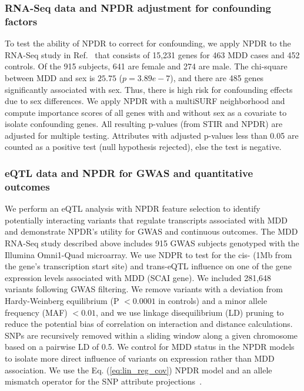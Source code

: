 \documentclass{bioinfo}
\begin{document}
\subsubsection{RNA-Seq data and NPDR adjustment for confounding factors}
To test the ability of NPDR to correct for confounding, we apply NPDR to the RNA-Seq study in Ref.~\citep{mostafavi14} that consists of 15,231 genes for 463 MDD cases and 452 controls.
Of the 915 subjects, 641 are female and 274 are male.
The chi-square between MDD and sex is $25.75$ ($p=3.89e-7$), and there are 485 genes significantly associated with sex.
Thus, there is high risk for confounding effects due to sex differences.
We apply NPDR with a multiSURF neighborhood and compute importance scores of all genes with and without sex as a covariate to isolate confounding genes. All resulting p-values (from STIR and NPDR) are adjusted for multiple testing.
Attributes with adjusted p-values less than 0.05 are counted as a positive test (null hypothesis rejected), else the test is negative.

\subsubsection{eQTL data and NPDR for GWAS and quantitative outcomes}
We perform an eQTL analysis with NPDR feature selection to identify potentially interacting variants that regulate transcripts associated with MDD and demonstrate NPDR's utility for GWAS and continuous outcomes.
The MDD RNA-Seq study described above includes 915 GWAS subjects genotyped with the Illumina Omni1-Quad microarray\citep{mostafavi14}.
We use NDPR to test for the cis- (1Mb from the gene's transcription start site) and trans-eQTL influence on one of the gene expression levels associated with MDD (SCAI gene).
We included 281,648 variants following GWAS filtering.
We remove variants with a deviation from Hardy-Weinberg equilibrium (P $<0.0001$ in controls) and a minor allele frequency (MAF) $<0.01$, and we use linkage disequilibrium (LD) pruning to reduce the potential bias of correlation on interaction and distance calculations.
SNPs are recursively removed within a sliding window along a given chromosome based on a pairwise LD of 0.5.
We control for MDD status in the NPDR models to isolate more direct influence of variants on expression rather than MDD association. We use the Eq. (\ref{eq:lin_reg_cov}) NPDR model and an allele mismatch operator for the SNP attribute projections~\citep{titv}. 
\end{document}
